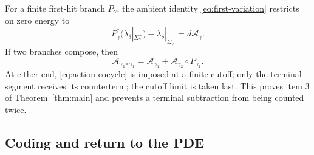 \documentclass[11pt,reqno]{amsart}
\numberwithin{equation}{section}
\theoremstyle{definition}
\theoremstyle{remark}
\newcommand{\cA}{\mathcal A}
\begin{document}
For a finite first-hit branch $P_\gamma$, the ambient identity
\eqref{eq:first-variation} restricts on zero energy to
\begin{equation}\label{eq:exact-branch}
 P_\gamma^*(\lambda_\delta|_{\Sigma_\gamma^+})
  -\lambda_\delta|_{\Sigma_\gamma^-}=d\cA_\gamma.
\end{equation}
If two branches compose, then
\begin{equation}\label{eq:action-cocycle}
 \cA_{\gamma_2\circ\gamma_1}
  =\cA_{\gamma_1}+\cA_{\gamma_2}\circ P_{\gamma_1}.
\end{equation}
At either end, \eqref{eq:action-cocycle} is imposed at a finite cutoff; only
the terminal segment receives its counterterm; the cutoff limit is taken
last.  This proves item 3 of Theorem~\ref{thm:main} and prevents a terminal
subtraction from being counted twice.

\subsection{Coding and return to the PDE}
\end{document}
